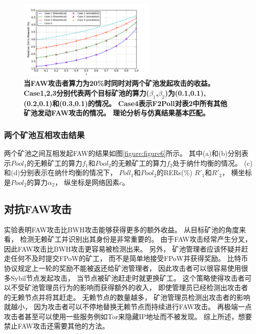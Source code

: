 \documentclass[a4paper, 11pt]{article}
\begin{document}
\begin{CJK*}{UTF8}{gbsn}
    \begin{figure}[h]
        \centering
        \includegraphics[width=0.6\textwidth]{figure4}
        \caption{\textbf{当FAW攻击者算力为20\%时同时对两个矿池发起攻击的收益。
        Case1,2,3分别代表两个目标矿池的算力($\beta_1$,$\beta_2$)为(0.1,0.1),(0.2,0.1)和(0.3,0.1)的情况。
        Case4表示F2Poll对表2中所有其他矿池发动FAW攻击的情况。
        理论分析与仿真结果基本匹配。}}
        \label{figure:figure4}
    \end{figure}



    \subsubsection{两个矿池互相攻击结果}

    \indent

    两个矿池之间互相发起FAW的结果如图\ref{figure:figure6}所示。
    其中(a)和(b)分别表示$Pool_1$的无赖矿工的算力$f_1$和$Pool_2$的无赖矿工的算力$f_2$处于纳什均衡的情况。
    (c)和(d)分别表示在纳什均衡的情况下，
    $Poll_1$和$Pool_2$的RERs(\%) $R'_1$和$R'_2$，
    横坐标是$Pool_2$的算力$\alpha_2$，
    纵坐标是网络因素$c$。

    \subsection{对抗FAW攻击}

    \indent

    实验表明FAW攻击比BWH攻击能够获得更多的额外收益。
    从目标矿池的角度来看，
    检测无赖矿工并识别出其身份是非常重要的。
    由于FAW攻击经常产生分叉，
    因此FAW攻击比BWH攻击更容易被检测出来。
    另外，
    矿池管理者应该怀疑并赶走任何不及时提交FPoW的矿工，
    而不是简单地接受FPoW并获得奖励。
    比特币协议规定上一轮的奖励不能被返还给矿池管理者，
    因此攻击者可以很容易使用很多Sybil节点发起攻击，
    当节点被矿池赶走时就更换矿工。
    这个策略使得攻击者可以不受矿池管理员行为的影响而获得额外的收入，
    即使管理员已经检测出攻击者的无赖节点并将其赶走。
    无赖节点的数量越多，
    矿池管理员检测出攻击者的影响就越小，
    因为攻击者可以不停地替换无赖节点而持续进行FAW攻击。
    再极端一点攻击者甚至可以使用一些服务例如Tor来隐藏IP地址而不被发现。
    综上所述，想要禁止FAW攻击还需要其他的方法。


\end{CJK*}
\end{document}
